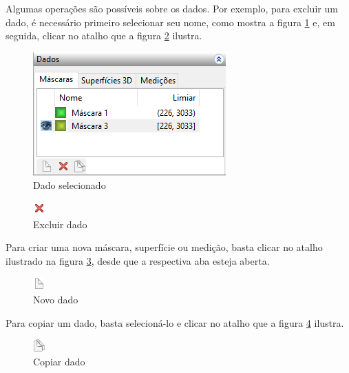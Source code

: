 Algumas operações são possíveis sobre os dados. Por exemplo, para excluir um dado, é necessário
primeiro selecionar seu nome, como mostra a figura \ref{fig:selected_mask} e, em seguida, clicar
no atalho que a figura \ref{fig:delete_data} ilustra.

\begin{figure}[!htb]
\centering
\includegraphics[scale=0.7]{../user_guide_figures/invesalius_screen/painel_selected_mask_pt.png}
\caption{Dado selecionado}
\label{fig:selected_mask}
\end{figure}


\begin{figure}[!htb]
\centering
\includegraphics[scale=0.8]{../user_guide_figures/icons/data_remove.png}
\caption{Excluir dado}
\label{fig:delete_data}
\end{figure}

Para criar uma nova máscara, superfície ou medição, basta clicar no atalho ilustrado na figura
\ref{fig:new_data}, desde que a respectiva aba esteja aberta.

\begin{figure}[!htb]
\centering
\includegraphics[scale=0.8]{../user_guide_figures/icons/data_new.png}
\caption{Novo dado}
\label{fig:new_data}
\end{figure}

Para copiar um dado, basta selecioná-lo e clicar no atalho que a figura \ref{fig:duplicate_data}
ilustra.

\begin{figure}[!htb]
\centering
\includegraphics[scale=0.8]{../user_guide_figures/icons/data_duplicate.png}
\caption{Copiar dado}
\label{fig:duplicate_data}
\end{figure}


